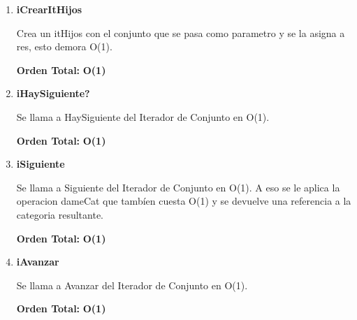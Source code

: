 \vspace*{1em}
\begin{enumerate}

\item\textbf{iCrearItHijos}
\par Crea un itHijos con el conjunto que se pasa como parametro y se la asigna a res, esto demora O(1).
\par \textbf{Orden Total:} \textbf{O(1)}

\item\textbf{iHaySiguiente?}
\par Se llama a HaySiguiente del Iterador de Conjunto en O(1).
\par \textbf{Orden Total:} \textbf{O(1)}

\item\textbf{iSiguiente}
\par Se llama a Siguiente del Iterador de Conjunto en O(1). A eso se le aplica la operacion dameCat que tambíen cuesta O(1) y se devuelve una referencia a la categoria resultante.
\par \textbf{Orden Total:} \textbf{O(1)}

\item\textbf{iAvanzar}
\par Se llama a Avanzar del Iterador de Conjunto en O(1).
\par \textbf{Orden Total:} \textbf{O(1)}

\end{enumerate}



